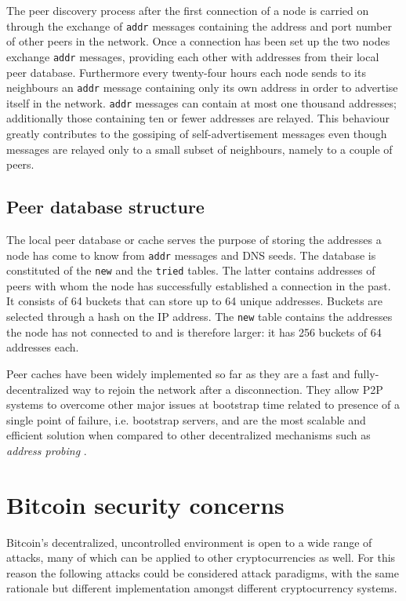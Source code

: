 \documentclass[12pt, letterpaper, twoside]{article}
\begin{document}
The peer discovery process after the first connection of a node is carried on through the exchange of \texttt{addr} messages containing the address and port number of other peers in the network. Once a connection has been set up the two nodes exchange \texttt{addr} messages, providing each other with addresses from their local peer database. Furthermore every twenty-four hours each node sends to its neighbours an \texttt{addr} message containing only its own address in order to advertise itself in the network. \texttt{addr} messages can contain at most one thousand addresses; additionally those containing ten or fewer addresses are relayed. This behaviour greatly contributes to the gossiping of self-advertisement messages even though messages are relayed only to a small subset of neighbours, namely to a couple of peers.

\subsection{Peer database structure}\label{cachestruct}
The local peer database or cache serves the purpose of storing the addresses a node has come to know from \texttt{addr} messages and DNS seeds. The database is constituted of the \texttt{new} and the \texttt{tried} tables. The latter contains addresses of peers with whom the node has successfully established a connection in the past. It consists of 64 buckets that can store up to 64 unique addresses. Buckets are selected through a hash on the IP address. The \texttt{new} table contains the addresses the node has not connected to and is therefore larger: it has 256 buckets of 64 addresses each.

Peer caches have been widely implemented so far as they are a fast and fully-decentralized way to rejoin the network after a disconnection. They allow P2P systems to overcome other major issues at bootstrap time related to presence of a single point of failure, i.e. bootstrap servers, and are the most scalable and efficient solution when compared to other decentralized mechanisms such as \textit{address probing} \cite{decentrbootstrapp2p}.

\section{Bitcoin security concerns}\label{securityintro}
Bitcoin's decentralized, uncontrolled environment is open to a wide range of attacks, many of which can be applied to other cryptocurrencies as well. For this reason the following attacks could be considered attack paradigms, with the same rationale but different implementation amongst different cryptocurrency systems.
\end{document}
